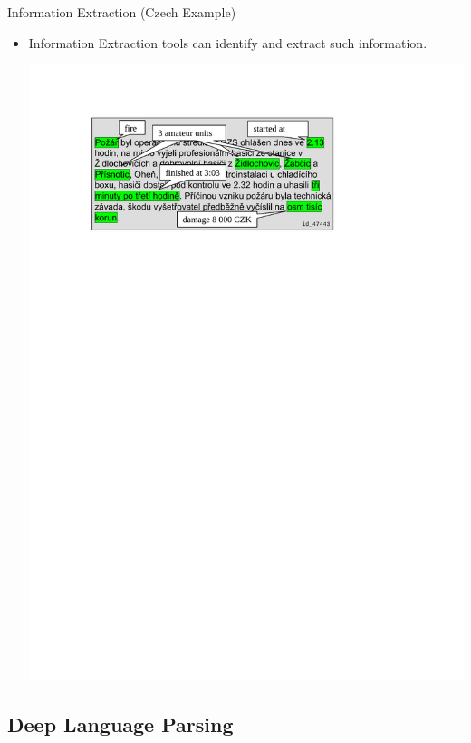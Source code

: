 \documentclass[xcolor=dvipsnames]{beamer}
\begin{document}
\begin{frame}{Information Extraction (Czech Example)}  
\begin{itemize}
	\item Information Extraction tools can identify and extract such information.
	\bigskip	
	\begin{center}
	\includegraphics[width=0.75\hsize]{img/fireman_annotated}
	\end{center}	
\end{itemize}
\end{frame}

\subsection{Deep Language Parsing} 
\end{document}
